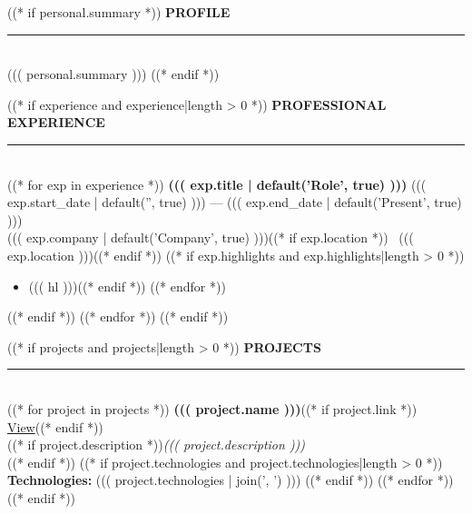 \documentclass[11pt,a4paper]{article}
\begin{document}
\hfill
\begin{minipage}[t]{0.60\textwidth}
\color{body}
\vspace{10mm}
\hspace{4mm}
\begin{minipage}[t]{0.88\textwidth}

((* if personal.summary *))
{\fontsize{11}{13}\selectfont\bfseries\color{navy}\MakeUppercase{Profile}}\\[2pt]
{\color{gold}\rule{\linewidth}{0.4pt}}\\[6pt]
{\small ((( personal.summary )))}
\vspace{9pt}
((* endif *))

((* if experience and experience|length > 0 *))
{\fontsize{11}{13}\selectfont\bfseries\color{navy}\MakeUppercase{Professional Experience}}\\[2pt]
{\color{gold}\rule{\linewidth}{0.4pt}}\\[8pt]
((* for exp in experience *))
{\bfseries ((( exp.title | default('Role', true) )))} \hfill {\small\color{muted} ((( exp.start_date | default('', true) ))) --- ((( exp.end_date | default('Present', true) )))}\\
{\small\color{muted} ((( exp.company | default('Company', true) )))((* if exp.location *)) \textbar\ ((( exp.location )))((* endif *))}
((* if exp.highlights and exp.highlights|length > 0 *))
\begin{itemize}[leftmargin=14pt, itemsep=1pt, parsep=0pt, topsep=4pt]
((* for hl in exp.highlights *))((* if hl *))\item {\small ((( hl )))}((* endif *))
((* endfor *))
\end{itemize}
((* endif *))
\vspace{8pt}
((* endfor *))
((* endif *))

((* if projects and projects|length > 0 *))
{\fontsize{11}{13}\selectfont\bfseries\color{navy}\MakeUppercase{Projects}}\\[2pt]
{\color{gold}\rule{\linewidth}{0.4pt}}\\[6pt]
((* for project in projects *))
{\bfseries ((( project.name )))}((* if project.link *)) \hfill {\scriptsize\href{((* if 'http' not in project.link *))https://((* endif *))((( project.link )))}{View}}((* endif *))\\
((* if project.description *)){\small\textit{((( project.description )))}}\\((* endif *))
((* if project.technologies and project.technologies|length > 0 *))
{\small\textbf{Technologies:} ((( project.technologies | join(', ') )))}
((* endif *))
\vspace{6pt}
((* endfor *))
((* endif *))


\end{minipage}
\end{minipage}
\end{document}
